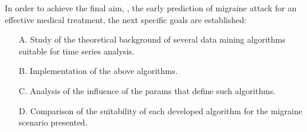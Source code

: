 \label{chapter:objectives}
 
In   order   to  achieve  the  final  aim, \ie,  the  early  prediction  of  migraine  attack  for  an  effective medical treatment, the next specific goals are established: 
 
\begin{itemize} 
\item[A.] Study of the theoretical background of several data mining algorithms suitable for time series analysis.

\item[B.] Implementation of the above algorithms.

\item[C.] Analysis of the influence of the params that define such algorithms.

\item[D.] Comparison of the suitability of each developed algorithm for the migraine scenario presented.

\end{itemize} 
 
 

